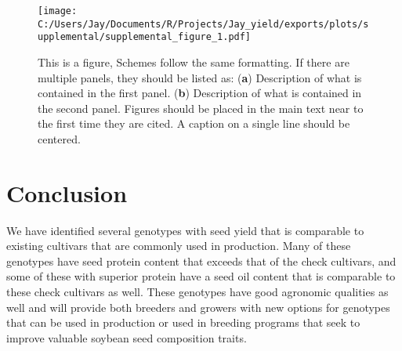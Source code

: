 \documentclass[Agronomy,article,submit,moreauthors,pdftex]{mdpi}
\begin{document}
\begin{figure}[H]
\centering
\texttt{[image: C:/Users/Jay/Documents/R/Projects/Jay\_yield/exports/plots/supplemental/supplemental\_figure\_1.pdf]}
\caption{This is a figure, Schemes follow the same formatting. If there are multiple panels, they should be listed as: (\textbf{a}) Description of what is contained in the first panel. (\textbf{b}) Description of what is contained in the second panel. Figures should be placed in the main text near to the first time they are cited. A caption on a single line should be centered.}
\end{figure}

\hypertarget{conclusion}{%
\section{Conclusion}\label{conclusion}}

We have identified several genotypes with seed yield that is comparable
to existing cultivars that are commonly used in production. Many of
these genotypes have seed protein content that exceeds that of the check
cultivars, and some of these with superior protein have a seed oil
content that is comparable to these check cultivars as well. These
genotypes have good agronomic qualities as well and will provide both
breeders and growers with new options for genotypes that can be used in
production or used in breeding programs that seek to improve valuable
soybean seed composition traits.

%

\vspace{6pt}


\end{document}

